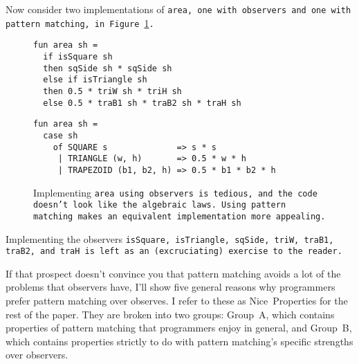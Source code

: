 \documentclass[manuscript,screen,review, 12pt, nonacm]{acmart}
\begin{document}
Now consider two implementations of \tt{area}, one with observers and one with
pattern matching, in Figure~\ref{fig:area}.

    \begin{figure}[H]
      \begin{minipage}[t]{0.7\textwidth}
        \begin{verbatim}
fun area sh =
  if isSquare sh
  then sqSide sh * sqSide sh
  else if isTriangle sh 
  then 0.5 * triW sh * triH sh
  else 0.5 * traB1 sh * traB2 sh * traH sh
            \end{verbatim}
            \label{fig:observerarea} 
      \end{minipage}
      \vfill
      \begin{minipage}[t]{0.7\textwidth}
        \begin{verbatim}
fun area sh =
  case sh 
    of SQUARE s              => s * s
     | TRIANGLE (w, h)       => 0.5 * w * h
     | TRAPEZOID (b1, b2, h) => 0.5 * b1 * b2 * h
                \end{verbatim}
       \vspace{2.2em}
       \label{fig:pmarea}
      \end{minipage}
      \caption{Implementing \tt{area} using observers is tedious, and the code
      doesn't look like the algebraic laws. Using pattern matching makes an
      equivalent implementation more appealing.}
      \label{fig:area}
    \end{figure}

    Implementing the observers \tt{isSquare}, \tt{isTriangle}, \tt{sqSide},
    \tt{triW}, \tt{traB1}, \tt{traB2}, and \tt{traH} is left as an
    (excruciating) exercise to the reader. 

    If that prospect doesn't convince you that pattern matching avoids a lot of
    the problems that observers have, I'll show five general reasons why
    programmers prefer pattern matching over observes. I refer to these as
    Nice~Properties for the rest of the paper. They are broken into two groups:
    Group~A, which contains properties of pattern matching that programmers
    enjoy in general, and Group~B,  which contains properties strictly to do
    with pattern matching's specific strengths over observers. 
\end{document}
